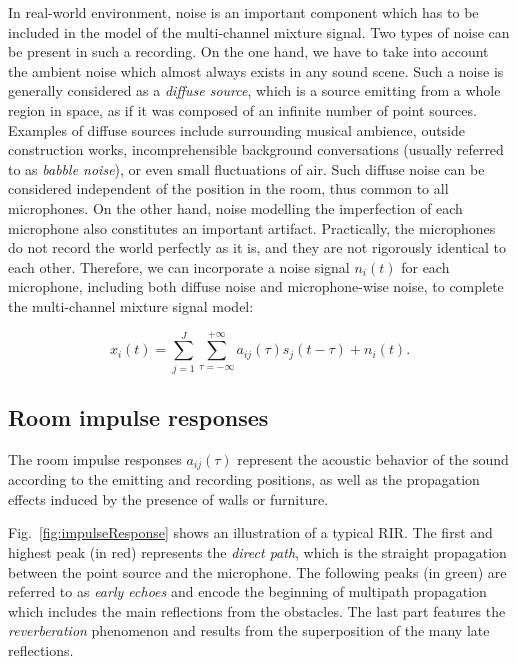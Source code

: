 In real-world environment, noise is an important component which has to be included in the model of the multi-channel mixture signal. Two types of noise can be present in such a recording. On the one hand, we have to take into account the ambient noise which almost always exists in any sound scene. Such a noise is generally considered as a \textit{diffuse source}, which is a source emitting from a whole region in space, as if it was composed of an infinite number of point sources. Examples of diffuse sources include surrounding musical ambience, outside construction works, incomprehensible background conversations (usually referred to as \textit{babble noise}), or even small fluctuations of air. Such diffuse noise can be considered independent of the position in the room, thus common to all microphones. On the other hand, noise modelling the imperfection of each microphone also constitutes an important artifact. Practically, the microphones do not record the world perfectly as it is, and they are not rigorously identical to each other. Therefore, we can incorporate a noise signal $n_i(t)$ for each microphone, including both diffuse noise and microphone-wise noise, to complete the multi-channel mixture signal model:

\begin{equation}
    x_i(t) = \sum_{j=1}^J \sum_{\tau=-\infty}^{+\infty} a_{ij}(\tau) s_j(t-\tau) + n_i(t).
\end{equation}

\subsection{Room impulse responses}

The room impulse responses $a_{ij}(\tau)$ represent the acoustic behavior of the sound according to the emitting and recording positions, as well as the propagation effects induced by the presence of walls or furniture. 

Fig.~\ref{fig:impulseResponse} shows an illustration of a typical RIR. The first and highest peak (in red) represents the \textit{direct path}, which is the straight propagation between the point source and the microphone. The following peaks (in green) are referred to as \textit{early echoes} and encode the beginning of multipath propagation which includes the main reflections from the obstacles. The last part features the \textit{reverberation} phenomenon and results from the superposition of the many late reflections.

